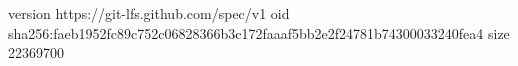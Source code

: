 version https://git-lfs.github.com/spec/v1
oid sha256:faeb1952fc89c752c06828366b3c172faaaf5bb2e2f24781b74300033240fea4
size 22369700
